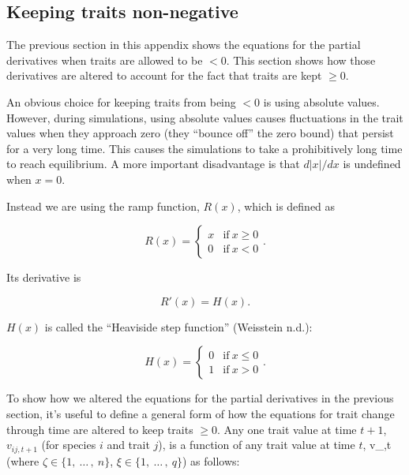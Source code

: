 \subsection*{Keeping traits non-negative}


The previous section in this appendix shows the equations for the
partial derivatives when traits are allowed to be $<0$.
This section shows how those derivatives are altered to account for
the fact that traits are kept $\ge 0$.


An obvious choice for keeping traits from being $<0$ is using absolute
values.
However, during simulations, using absolute values causes fluctuations
in the trait values when they approach zero (they ``bounce off''
the zero bound) that persist for a very long time.
This causes the simulations to take a prohibitively long time to reach
equilibrium.
A more important disadvantage is that $d \lvert x \rvert / dx$ is
undefined when $x = 0$.


Instead we are using the ramp function, $R(x)$, which is defined as

\begin{equation*}
    R(x) = \begin{cases}
        x & \text{if}\ x \ge 0 \\
        0 & \text{if}\ x < 0
        \end{cases}
    \text{.}
\end{equation*}


\noindent Its derivative is

\begin{equation*}
    R'(x) = H(x).
\end{equation*}

\noindent $H(x)$ is called the ``Heaviside step function'' (Weisstein n.d.):

\begin{equation*}
    H(x) = \begin{cases}
        0 & \text{if}\ x \le 0 \\
        1 & \text{if}\ x > 0
        \end{cases}
    \text{.}
\end{equation*}



To show how we altered the equations for the partial derivatives
in the previous section, it's useful to define a general form of how
the equations for trait change through time are altered to keep traits $\ge 0$.
Any one trait value at time $t+1$,
$v_{ij,t+1}$ (for species $i$ and trait $j$),
is a function of any trait value at time $t$, v_{\zeta\xi,t}
(where $\zeta \in \{ 1, \: \ldots \, , \: n \}$,
$\xi \in \{ 1, \: \ldots \, , \: q \}$)
as follows:

